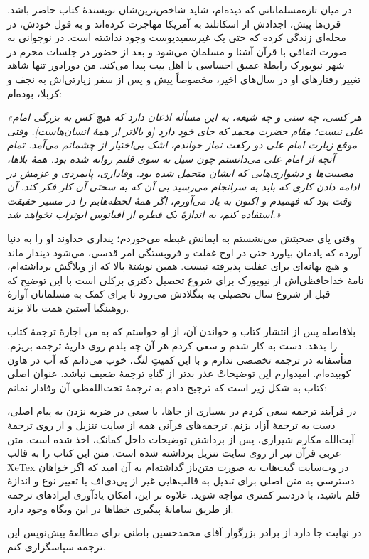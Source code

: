  {
در میان تازه‌مسلمانانی که دیده‌ام، شاید شاخص‌ترین‌شان نویسندهٔ  کتاب  حاضر باشد.  قرن‌ها پیش، اجدادش از اسکاتلند به آمریکا مهاجرت کرده‌اند و به قول خودش، در محله‌ای زندگی کرده که حتی یک غیرسفید‌پوست وجود نداشته است. در نوجوانی به صورت اتفاقی با قرآن آشنا و مسلمان می‌شود و بعد از حضور در جلسات محرم در شهر نیویورک رابطهٔ عمیق احساسی با اهل بیت {} پیدا می‌کند. من دورادور تنها شاهد تغییر رفتارهای او در سال‌های اخیر، مخصوصاً پیش و پس از سفر زیارتی‌اش به نجف و کربلا، بوده‌ام:

\textit{
	«هر کسی، چه سنی و چه شیعه، به این مسأله اذعان دارد که هیچ کس به بزرگی امام علی{} نیست؛ مقام حضرت محمد{} که جای خود دارد [و بالاتر از همهٔ انسان‌هاست]. وقتی موقع زیارت امام علی{} دو رکعت نماز خواندم، اشک بی‌اختیار از چشمانم می‌آمد.  تمام آنچه از امام علی{} می‌دانستم چون سیل به سوی قلبم روانه شده بود. همهٔ بلاها، مصیبت‌ها و دشواری‌هایی که ایشان متحمل شده بود. وفاداری، پایمردی و عزمش در ادامه دادن کاری که باید به سرانجام می‌رسید بی آن که به سختی آن کار فکر کند. آن وقت بود که فهمیدم و اکنون به یاد می‌آورم، اگر همهٔ لحظه‌هایم را در مسیر حقیقت استفاده کنم، به اندازهٔ یک قطره از اقیانوس ابوتراب{} نخواهد شد.»}
	
	وقتی پای صحبتش می‌نشستم به ایمانش غبطه می‌خوردم؛ پنداری خداوند او را به دنیا آورده که یادمان بیاورد حتی در اوج غفلت و فروبستگی امر قدسی، می‌شود دیندار ماند و هیچ بهانه‌ای برای غفلت پذیرفته نیست. همین نوشتهٔ بالا که از وبلاگش برداشته‌ام، نامهٔ خداحافظی‌اش از نیویورک برای شروع تحصیل دکتری برکلی است با این توضیح که قبل از شروع سال تحصیلی به بنگلادش می‌رود تا برای کمک به مسلمانان آوارهٔ روهینگیا آستین همت  بالا بزند.
	
	بلافاصله پس از انتشار کتاب و خواندن آن، از او خواستم که به من اجازهٔ ترجمهٔ کتاب را بدهد. دست به کار شدم و سعی کردم هر آن چه بلدم روی داریهٔ ترجمه بریزم. متأسفانه  در ترجمه تخصصی ندارم و با این کمیتِ لنگ، خوب می‌دانم که آب در هاون کوبیده‌ام. امیدوارم این توضیحاتْ عذر بدتر از گناهِ ترجمهٔ ضعیف نباشد. عنوان اصلی کتاب به شکل زیر است که ترجیح دادم به ترجمهٔ تحت‌اللفظی آن وفادار نمانم:
	\begin{center}
{\small		{} }
	\end{center}
	
	در فرآیند ترجمه سعی کردم در بسیاری از جاها، با سعی در ضربه نزدن به پیام اصلی، دست به ترجمهٔ آزاد بزنم. ترجمه‌های قرآنی همه از سایت تنزیل و از روی ترجمهٔ آیت‌الله مکارم شیرازی، پس از برداشتن توضیحات داخل کمانک، اخذ شده است. متن عربی قرآن نیز از روی سایت تنزیل برداشته شده است. متن این کتاب را به قالب XeTex در وب‌سایت گیت‌هاب‌‌ به صورت متن‌باز گذاشته‌ام به آن امید که اگر خواهان دسترسی به متن اصلی برای تبدیل به قالب‌هایی غیر از پی‌دی‌اف یا تغییر نوع و اندازهٔ قلم باشید، با دردسر کمتری مواجه شوید. علاوه بر این، امکان یادآوری ایرادهای ترجمه از طریق سامانهٔ پیگیری خطاها در این وبگاه وجود دارد:
	\begin{center}
	\end{center}
	در نهایت جا دارد از برادر بزرگوار آقای محمدحسین باطنی برای مطالعهٔ پیش‌نویس این ترجمه سپاسگزاری کنم. 
	
}
